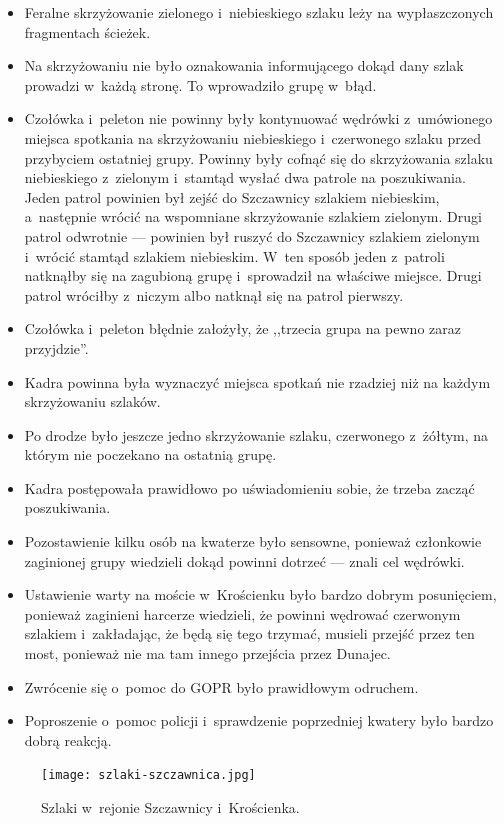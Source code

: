 \documentclass[a5paper,10pt,titlepage,twoside]{article}
\begin{document}
{{\begin{itemize}
\item Feralne skrzyżowanie zielonego i~niebieskiego szlaku leży na wypłaszczonych fragmentach ścieżek.
\item Na skrzyżowaniu nie było oznakowania informującego dokąd dany szlak prowadzi w~każdą stronę. To wprowadziło grupę w~błąd.
\item Czołówka i~peleton nie powinny były kontynuować wędrówki z~umówionego miejsca spotkania na skrzyżowaniu niebieskiego i~czerwonego szlaku przed przybyciem ostatniej grupy. Powinny były cofnąć się do skrzyżowania szlaku niebieskiego z~zielonym i~stamtąd wysłać dwa patrole na poszukiwania. Jeden patrol powinien był zejść do Szczawnicy szlakiem niebieskim, a~następnie wrócić na wspomniane skrzyżowanie szlakiem zielonym. Drugi patrol odwrotnie --- powinien był ruszyć do Szczawnicy szlakiem zielonym i~wrócić stamtąd szlakiem niebieskim. W~ten sposób jeden z~patroli natknąłby się na zagubioną grupę i~sprowadził na właściwe miejsce. Drugi patrol wróciłby z~niczym albo natknął się na patrol pierwszy.
\item Czołówka i~peleton błędnie założyły, że ,,trzecia grupa na pewno zaraz przyjdzie''.
\item Kadra powinna była wyznaczyć miejsca spotkań nie rzadziej niż na każdym skrzyżowaniu szlaków.
\item Po drodze było jeszcze jedno skrzyżowanie szlaku, czerwonego z~żółtym, na którym nie poczekano na ostatnią grupę.
\item Kadra postępowała prawidłowo po uświadomieniu sobie, że trzeba zacząć poszukiwania.
\item Pozostawienie kilku osób na kwaterze było sensowne, ponieważ członkowie zaginionej grupy wiedzieli dokąd powinni dotrzeć --- znali cel wędrówki.
\item Ustawienie warty na moście w~Krościenku było bardzo dobrym posunięciem, ponieważ zaginieni harcerze wiedzieli, że powinni wędrować czerwonym szlakiem i~zakładając, że będą się tego trzymać, musieli przejść przez ten most, ponieważ nie ma tam innego przejścia przez Dunajec.
\item Zwrócenie się o~pomoc do GOPR było prawidłowym odruchem.
\item Poproszenie o~pomoc policji i~sprawdzenie poprzedniej kwatery było bardzo dobrą reakcją.
\end{itemize}
\begin{figure}[htp]
\centering
\texttt{[image: szlaki-szczawnica.jpg]}
\caption[Cantin for LOP]{Szlaki w~rejonie Szczawnicy i~Krościenka.\footnotemark}\label{fig:szlaki}

\end{figure}}}
\end{document}
